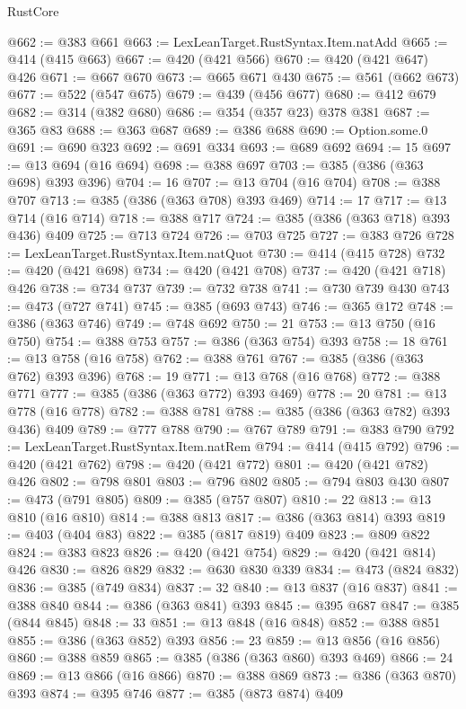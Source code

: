 \begin{lexlean}{RustCore}
\begin{coremodule}
@662 := @383 @661
@663 := LexLeanTarget.RustSyntax.Item.natAdd
@665 := @414 (@415 @663)
@667 := @420 (@421 @566)
@670 := @420 (@421 @647) @426
@671 := @667 @670
@673 := @665 @671 @430
@675 := @561 (@662 @673)
@677 := @522 (@547 @675)
@679 := @439 (@456 @677)
@680 := @412 @679
@682 := @314 (@382 @680)
@686 := @354 (@357 @23) @378 @381
@687 := @365 @83
@688 := @363 @687
@689 := @386 @688
@690 := Option.some.{0}
@691 := @690 @323
@692 := @691 @334
@693 := @689 @692
@694 := 15
@697 := @13 @694 (@16 @694)
@698 := @388 @697
@703 := @385 (@386 (@363 @698) @393 @396)
@704 := 16
@707 := @13 @704 (@16 @704)
@708 := @388 @707
@713 := @385 (@386 (@363 @708) @393 @469)
@714 := 17
@717 := @13 @714 (@16 @714)
@718 := @388 @717
@724 := @385 (@386 (@363 @718) @393 @436) @409
@725 := @713 @724
@726 := @703 @725
@727 := @383 @726
@728 := LexLeanTarget.RustSyntax.Item.natQuot
@730 := @414 (@415 @728)
@732 := @420 (@421 @698)
@734 := @420 (@421 @708)
@737 := @420 (@421 @718) @426
@738 := @734 @737
@739 := @732 @738
@741 := @730 @739 @430
@743 := @473 (@727 @741)
@745 := @385 (@693 @743)
@746 := @365 @172
@748 := @386 (@363 @746)
@749 := @748 @692
@750 := 21
@753 := @13 @750 (@16 @750)
@754 := @388 @753
@757 := @386 (@363 @754) @393
@758 := 18
@761 := @13 @758 (@16 @758)
@762 := @388 @761
@767 := @385 (@386 (@363 @762) @393 @396)
@768 := 19
@771 := @13 @768 (@16 @768)
@772 := @388 @771
@777 := @385 (@386 (@363 @772) @393 @469)
@778 := 20
@781 := @13 @778 (@16 @778)
@782 := @388 @781
@788 := @385 (@386 (@363 @782) @393 @436) @409
@789 := @777 @788
@790 := @767 @789
@791 := @383 @790
@792 := LexLeanTarget.RustSyntax.Item.natRem
@794 := @414 (@415 @792)
@796 := @420 (@421 @762)
@798 := @420 (@421 @772)
@801 := @420 (@421 @782) @426
@802 := @798 @801
@803 := @796 @802
@805 := @794 @803 @430
@807 := @473 (@791 @805)
@809 := @385 (@757 @807)
@810 := 22
@813 := @13 @810 (@16 @810)
@814 := @388 @813
@817 := @386 (@363 @814) @393
@819 := @403 (@404 @83)
@822 := @385 (@817 @819) @409
@823 := @809 @822
@824 := @383 @823
@826 := @420 (@421 @754)
@829 := @420 (@421 @814) @426
@830 := @826 @829
@832 := @630 @830 @339
@834 := @473 (@824 @832)
@836 := @385 (@749 @834)
@837 := 32
@840 := @13 @837 (@16 @837)
@841 := @388 @840
@844 := @386 (@363 @841) @393
@845 := @395 @687
@847 := @385 (@844 @845)
@848 := 33
@851 := @13 @848 (@16 @848)
@852 := @388 @851
@855 := @386 (@363 @852) @393
@856 := 23
@859 := @13 @856 (@16 @856)
@860 := @388 @859
@865 := @385 (@386 (@363 @860) @393 @469)
@866 := 24
@869 := @13 @866 (@16 @866)
@870 := @388 @869
@873 := @386 (@363 @870) @393
@874 := @395 @746
@877 := @385 (@873 @874) @409

\end{coremodule}
\end{lexlean}
